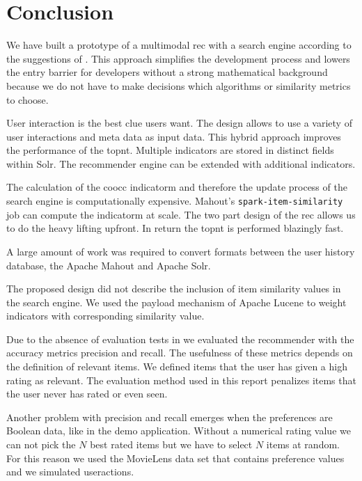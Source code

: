 \section{Conclusion}
\label{sec:conclusion}

We have built a prototype of a \gls{multimodal} \gls{rec} with a search engine according to the suggestions of \cite{Dunning14}. 
This approach simplifies the development process and lowers the entry barrier for developers without a strong mathematical background because we do not have to make decisions which algorithms or similarity metrics to choose. 

User interaction is the best clue users want.
The design allows to use a variety of user interactions and meta data as input data. This hybrid approach improves the performance of the \gls{topnt}. Multiple \glspl{indicator} are stored in distinct fields within Solr. The recommender engine can be extended with additional \glspl{indicator}.

The calculation of the \gls{coocc} \gls{indicatorm} and therefore the update process of the search engine is computationally expensive. Mahout's \verb|spark-item-similarity| job can compute the \gls{indicatorm} at scale.
The two part design of the \gls{rec} allows us to do the heavy lifting upfront. In return the \gls{topnt} is performed blazingly fast.

A large amount of work was required to convert formats between the user history database, the Apache Mahout and Apache Solr. 

The proposed design did not describe the inclusion of item similarity values in the search engine. We used the payload mechanism of Apache Lucene to weight indicators with corresponding similarity value.

Due to the absence of evaluation tests in \cite{Dunning14} we evaluated the recommender with the accuracy metrics \gls{precision} and \gls{recall}. The usefulness of these metrics depends on the definition of relevant items. We defined items that the user has given a high rating as relevant. The evaluation method used in this report penalizes items that the user never has rated or even seen. 

Another problem with precision and recall emerges when the \glspl{preference} are Boolean data, like in the demo application. Without a numerical rating value we can not pick the $N$ best rated items but we have to select $N$ items at random. For this reason we used the MovieLens data set that contains preference values and we simulated \glspl{useraction}.

